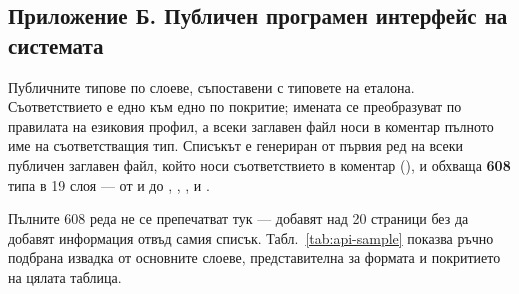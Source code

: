 \subsection*{Приложение Б. Публичен програмен интерфейс на системата}
Публичните типове по слоеве, съпоставени с типовете на еталона. Съответствието е едно към
едно по покритие; имената се преобразуват по правилата на езиковия профил, а всеки заглавен
файл носи в коментар пълното име на съответстващия тип. Списъкът е генериран от първия ред на
всеки публичен заглавен файл, който носи съответствието в коментар (),
и обхваща \textbf{608} типа в 19 слоя --- от  и  до ,
, ,  и .

Пълните 608 реда не се препечатват тук --- добавят над 20 страници без да добавят информация
отвъд самия списък. Табл.~\ref{tab:api-sample} показва ръчно подбрана извадка от основните
слоеве, представителна за формата и покритието на цялата таблица.

